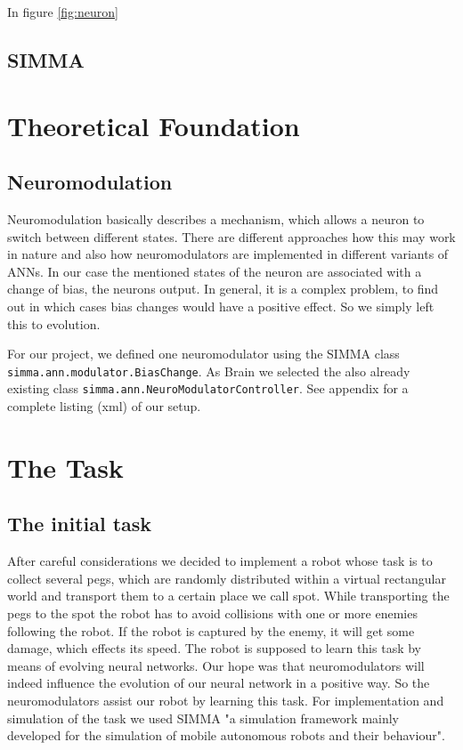 \documentclass[12pt,fleqn,a4paper]{article}
\begin{document}
In figure \ref{fig:neuron} 

\subsection{SIMMA}

\section{Theoretical Foundation}
\subsection{Neuromodulation}
Neuromodulation basically describes a mechanism, which allows a neuron to switch between different states. There are different approaches how this may work in nature and also how neuromodulators are implemented in different variants of ANNs. In our case the mentioned states of the neuron are associated with a change of bias, the neurons output. In general, it is a complex problem, to find out in which cases bias changes would have a positive effect. So we simply left this to evolution.

For our project, we defined one neuromodulator using the SIMMA class\\ \texttt{simma.ann.modulator.BiasChange}. As Brain we selected the also already existing class \texttt{simma.ann.NeuroModulatorController}. See appendix for a complete listing (xml) of our setup.

\section{The Task}

\subsection{The initial task}
After careful considerations we decided to implement a robot whose task is to collect several pegs, which are randomly distributed within a virtual rectangular world and transport them to a certain place we call spot. While transporting the pegs to the spot the robot has to avoid collisions with one or more enemies following the robot. If the robot is captured by the enemy, it will get some damage, which effects its speed. The robot is supposed to learn this task by means of evolving neural networks. Our hope was that neuromodulators will indeed influence the evolution of our neural network in a positive way. So the neuromodulators assist our robot by learning this task. For implementation and simulation of the task we used SIMMA "a simulation framework mainly developed for the simulation of mobile autonomous robots and their behaviour".
\end{document}
